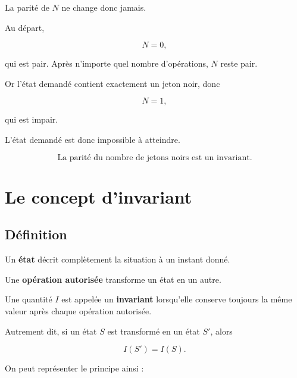 \documentclass[11pt]{article}
\begin{document}
La parité de \(N\) ne change donc jamais.

Au départ,

\[
N=0,
\]

qui est pair. Après n'importe quel nombre d'opérations, \(N\) reste pair.

Or l'état demandé contient exactement un jeton noir, donc

\[
N=1,
\]

qui est impair.

L'état demandé est donc impossible à atteindre.

\[
\boxed{
\text{La parité du nombre de jetons noirs est un invariant.}
}
\]

\section{Le concept d'invariant}\label{sec:concept-invariant}

\subsection{Définition}\label{sec:definition-invariant}

\begin{definition}[Invariant]
Un \textbf{état} décrit complètement la situation à un instant donné.

Une \textbf{opération autorisée} transforme un état en un autre.

Une quantité \(I\) est appelée un \textbf{invariant} lorsqu'elle conserve
toujours la même valeur après chaque opération autorisée.

Autrement dit, si un état \(S\) est transformé en un état \(S'\), alors

\[
\boxed{I(S')=I(S).}
\]
\end{definition}

On peut représenter le principe ainsi :

\begin{center}
\end{center}
\end{document}
